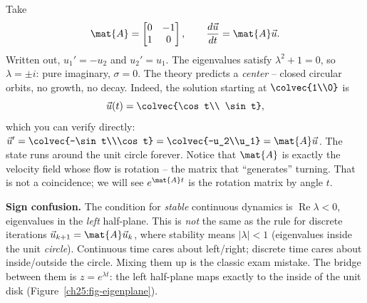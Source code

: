 \begin{example}
\label{ch25:complex}
Take
\[
  \mat{A} = \begin{bmatrix} 0 & -1 \\ 1 & 0 \end{bmatrix},
  \qquad \frac{d\vec{u}}{dt}=\mat{A}\vec{u}.
\]
Written out, $u_1' = -u_2$ and $u_2' = u_1$. The eigenvalues satisfy
$\lambda^2 + 1 = 0$, so $\lambda = \pm i$: pure imaginary, $\sigma=0$. The theory
predicts a \emph{center} -- closed circular orbits, no growth, no decay. Indeed,
the solution starting at $\colvec{1\\0}$ is
\[
  \vec{u}(t) = \colvec{\cos t\\ \sin t},
\]
which you can verify directly: $\vec{u}'=\colvec{-\sin t\\\cos t}
=\colvec{-u_2\\u_1}=\mat{A}\vec{u}$. The state runs around the unit circle
forever. Notice that $\mat{A}$ is exactly the velocity field whose flow is
rotation -- the matrix that ``generates'' turning. That is not a coincidence; we
will see $e^{\mat{A}t}$ is the rotation matrix by angle $t$.
\end{example}

\begin{trapbox}
\textbf{Sign confusion.} The condition for \emph{stable} continuous dynamics is
$\operatorname{Re}\lambda < 0$, eigenvalues in the \emph{left} half-plane. This is
\emph{not} the same as the rule for discrete iterations $\vec{u}_{k+1} =
\mat{A}\vec{u}_k$, where stability means $|\lambda| < 1$ (eigenvalues inside the
unit \emph{circle}). Continuous time cares about left/right; discrete time cares
about inside/outside the circle. Mixing them up is the classic exam mistake. The
bridge between them is $z = e^{\lambda t}$: the left half-plane maps exactly to
the inside of the unit disk (Figure~\ref{ch25:fig-eigenplane}).
\end{trapbox}

